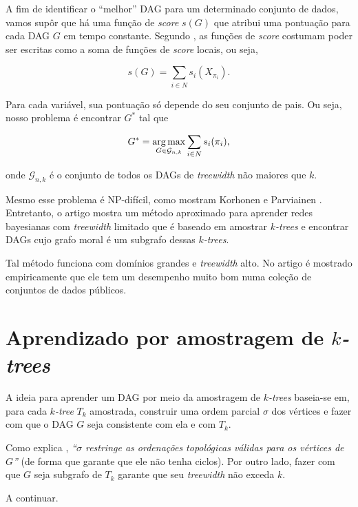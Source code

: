 \vspace{2em}

A fim de identificar o ``melhor'' DAG para um determinado conjunto de dados, vamos supôr que há uma função de \emph{score} $s(G)$ que atribui uma pontuação para cada DAG $G$ em tempo constante. Segundo \cite{nie}, as funções de \emph{score} costumam poder ser escritas como a soma de funções de \emph{score} locais, ou seja,

$$s(G) = \sum_{i \in N} s_i(X_{\pi_i}).$$

Para cada variável, sua pontuação só depende do seu conjunto de pais. Ou seja, nosso problema é encontrar $G^*$ tal que

$$G^* = \operatorname*{arg\,max}_{G \in \mathcal{G}_{n,k}} \sum_{i \in N} s_i(\pi_i),$$

onde $\mathcal{G}_{n,k}$ é o conjunto de todos os DAGs de \emph{treewidth} não maiores que $k$.

Mesmo esse problema é NP-difícil, como mostram Korhonen e Parviainen \cite{korhonen}. Entretanto, o artigo \cite{maua} mostra um método aproximado para aprender redes bayesianas com \emph{treewidth} limitado que é baseado em amostrar \emph{$k$-trees} e encontrar DAGs cujo grafo moral é um subgrafo dessas \emph{$k$-trees}.

Tal método funciona com domínios grandes e \emph{treewidth} alto. No artigo é mostrado empiricamente que ele tem um desempenho muito bom numa coleção de conjuntos de dados públicos.

\section{Aprendizado por amostragem de \emph{$k$-trees}}
\label{sec:aprendizado}

A ideia para aprender um DAG por meio da amostragem de \emph{$k$-trees} baseia-se em, para cada \emph{$k$-tree} $T_k$ amostrada, construir uma ordem parcial $\sigma$ dos vértices e fazer com que o DAG $G$ seja consistente com ela e com $T_k$.

Como explica \cite{maua}, \emph{``$\sigma$ restringe as ordenações topológicas válidas para os vértices de $G$''} (de forma que garante que ele não tenha ciclos). Por outro lado, fazer com que $G$ seja subgrafo de $T_k$ garante que seu \emph{treewidth} não exceda $k$.

A continuar. %


